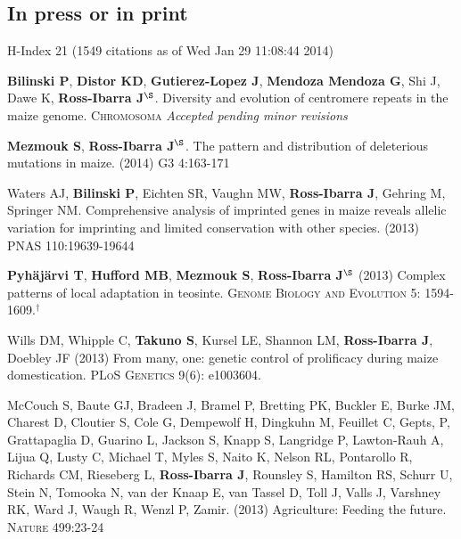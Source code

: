 \documentclass[letterpaper]{article}
\begin{document}
\subsection*{In press or in print} %
H-Index 21 \small{(1549 citations as of Wed Jan 29 11:08:44 2014)}
\begin{etaremune}

\item {\bf Bilinski P}, {\bf Distor KD}, {\bf Gutierez-Lopez J}, {\bf Mendoza Mendoza G}, Shi J, Dawe K,  {\bf Ross-Ibarra J}$^\S$. Diversity and evolution of centromere repeats in the maize genome. \textsc{Chromosoma} \emph{Accepted pending minor revisions}

\item {\bf Mezmouk S}, {\bf Ross-Ibarra J}$^\S$. The pattern and distribution of deleterious mutations in maize. (2014) \textsc{G3} 4:163-171
\\%

\item Waters AJ, {\bf Bilinski P}, Eichten SR, Vaughn MW, {\bf Ross-Ibarra J}, Gehring M, Springer NM. Comprehensive analysis of imprinted genes in maize reveals allelic variation for imprinting and limited conservation with other species. (2013) \textsc{PNAS} 110:19639-19644 
\\%

\item {\bf Pyh\"aj\"arvi T}, {\bf Hufford MB}, {\bf Mezmouk S}, {\bf Ross-Ibarra J}$^\S$ (2013) Complex patterns of local adaptation in teosinte. \textsc{Genome Biology and Evolution} 5: 1594-1609.$^\dagger$
\\%

\item Wills DM, Whipple C, {\bf Takuno S}, Kursel LE, Shannon LM, {\bf Ross-Ibarra J}, Doebley JF (2013) From many, one: genetic control of prolificacy during maize domestication. \textsc{PLoS Genetics} 9(6): e1003604. %
\\%

\item McCouch S, Baute GJ, Bradeen J, Bramel P, Bretting PK, Buckler E, Burke JM, Charest D, Cloutier S, Cole G, Dempewolf H, Dingkuhn M, Feuillet C, Gepts, P, Grattapaglia D, Guarino L, Jackson S, Knapp S, Langridge P, Lawton-Rauh A, Lijua Q, Lusty C, Michael T, Myles S, Naito K, Nelson RL, Pontarollo R, Richards CM, Rieseberg L, {\bf Ross-Ibarra J}, Rounsley S, Hamilton RS, Schurr U, Stein N, Tomooka N, van der Knaap E, van Tassel D, Toll J, Valls J, Varshney RK, Ward J, Waugh R, Wenzl P, Zamir. (2013) Agriculture: Feeding the future. \textsc{Nature} 499:23-24
\\%


\end{etaremune}
\end{document}
